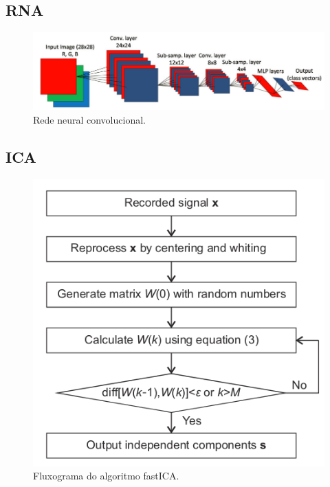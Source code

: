 \subsection{RNA}

\begin{figure}[H]
    \caption{Rede neural convolucional.}
    \begin{center}
        \includegraphics[scale=.4]{referencial/img/cnn_image_ince_p5.png}
    \end{center}
    \label{fig:}
\end{figure}


% 

\subsection{ICA}

\begin{figure}[H]
    \caption{Fluxograma do algoritmo fastICA.}
    \begin{center}
        \includegraphics[scale=.5]{referencial/img/fatica_fang_p3.png}
    \end{center}
    \label{fig:}
\end{figure}



